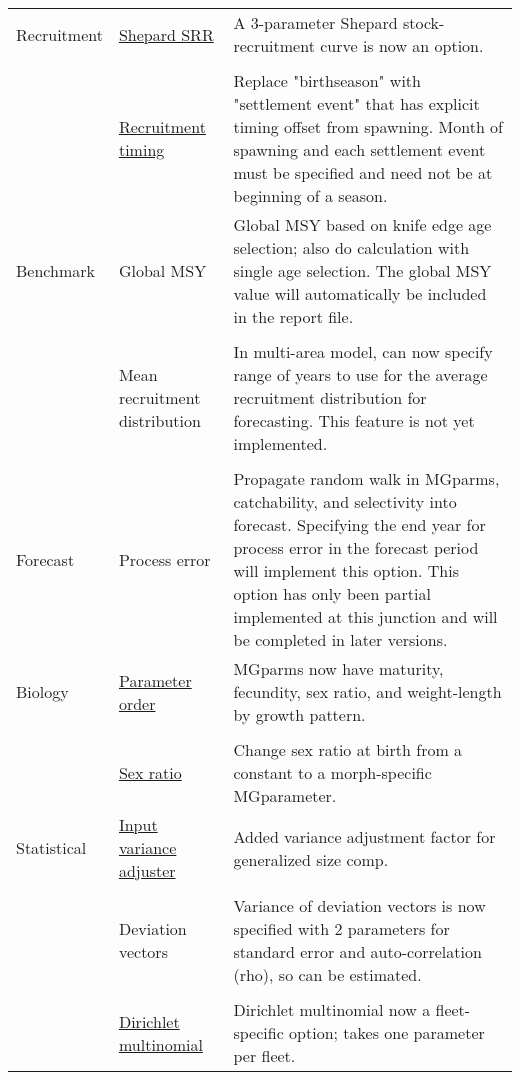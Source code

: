 \begin{center}
\begin{longtable}{p{2cm} p{3cm} p{10cm}}
				\hline
				Recruitment
					& \hyperlink{Shepard}{Shepard SRR} & 
						A 3-parameter Shepard stock-recruitment curve is now an option.\\
					\\
					& \hyperlink{RecrTiming}{Recruitment timing} & 
						Replace "birthseason" with "settlement event" that has explicit timing offset from spawning.  Month of spawning and each settlement event must be specified and need not be at beginning of a season.\\
				\hline
				Benchmark 
					& Global MSY &  
						Global MSY based on knife edge age selection; also do calculation with single age selection. The global MSY value will automatically be included in the report file.\\
				  \\					
					& Mean recruitment distribution & 
						In multi-area model, can now specify range of years to use for the average recruitment distribution for forecasting. This feature is not yet implemented. \\
				  \\
				\hline
				Forecast & 
					Process error & 
						Propagate random walk in MGparms, catchability, and selectivity into forecast. Specifying the end year for process error in the forecast period will implement this option.  This option has only been partial implemented at this junction and will be completed in later versions.\\
				\hline
				Biology 
					& \hyperlink{MGorder}{Parameter order} & 
						MGparms now have maturity, fecundity, sex ratio, and weight-length by growth pattern.\\
				  \\						
				    & \hyperlink{SexRatio}{Sex ratio} & 
					    Change sex ratio at birth from a constant to a morph-specific MGparameter. \\
				Statistical 
					& \hyperlink{GcompVar}{Input variance adjuster} & 
						Added variance adjustment factor for generalized size comp. \\
				  \\						
					& Deviation vectors & 
						Variance of deviation vectors is now specified with 2 parameters for standard error and auto-correlation (rho), so can be estimated.\\
				  \\						
					& \hyperlink{Dirichlet}{Dirichlet multinomial} & 
						Dirichlet multinomial now a fleet-specific option; takes one parameter per fleet. \\

\end{longtable}
\end{center}
